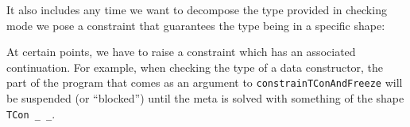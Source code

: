 It also includes any time we want to decompose the type provided in
checking mode we pose a constraint that guarantees the type being in a
specific shape:

\begin{imageonly}
\begin{Shaded}
\begin{Highlighting}[]
\OtherTok{=} 
\OtherTok{\textless{}{-}}
\OtherTok{\textless{}{-}}
\OtherTok{\textless{}{-}}\NormalTok{ (}
  \OtherTok{=} 

\end{Highlighting}
\end{Shaded}
\end{imageonly}

At certain points, we have to raise a constraint which has an associated
continuation. For example, when checking the type of a data constructor,
the part of the program that comes as an argument to
\texttt{constrainTConAndFreeze} will be suspended (or ``blocked'') until
the meta is solved with something of the shape \texttt{TCon\ \_\ \_}.

\begin{imageonly}
\begin{Shaded}
\begin{Highlighting}[]
\NormalTok{(}\OtherTok{=} 
\OtherTok{\textless{}{-}}
\OperatorTok{$} 
\OtherTok{\textless{}{-}}
\NormalTok{      (}\OtherTok{{-}\textgreater{}} 
\NormalTok{      \_ }\OtherTok{{-}\textgreater{}}  
\end{Highlighting}
\end{Shaded}
\end{imageonly}

